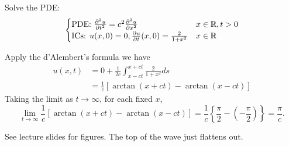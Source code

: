 \documentclass[class=article,crop=false]{standalone}
\begin{document}
\begin{eg}[]
Solve the PDE:
\begin{equation*}
\begin{cases}
	\text{PDE: } \frac{\partial^2 u}{\partial { t}^2} =c^2 \frac{\partial^2 u}{\partial { x}^2}  & x \in \mathbb{R}, t>0 \\
	\text{ICs: } u(x,0)=0 , \frac{\partial u}{\partial t} (x,0)= \frac{2}{1+x^2} & x \in \mathbb{R} \\
\end{cases}
\end{equation*}

Apply the d'Alembert's formula we have
\begin{align*}
	u(x,t)&=0+\frac{1}{2c} \int_{x-ct}^{x+ct} \frac{2}{1+x^2} ds\\
	      &= \frac{1}{c} [\arctan(x+ct) - \arctan(x-ct)] 
\end{align*}
Taking the limit as $ t \to \infty$, for each fixed $ x$,
 \[
	 \lim_{ t \to \infty} \frac{1}{c} [\arctan(x+ct) - \arctan(x-ct)] = \frac{1}{c}\left\{ \frac{\pi}{2}-\left(- \frac{\pi}{2} \right)  \right\} = \frac{\pi}{c} 
.\]

See lecture slides for figures. The top of the wave just flattens out.
\end{eg}
\end{document}
